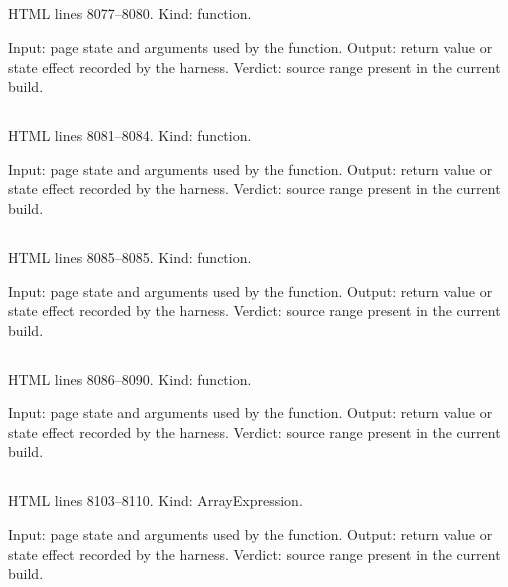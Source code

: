 \subsection*{\texttt{}}
\label{vf_427_csvq}
HTML lines 8077--8080. Kind: function.

Input: page state and arguments used by the function.
Output: return value or state effect recorded by the harness.
Verdict: source range present in the current build.

\subsection*{\texttt{}}
\label{vf_428_toCSV}
HTML lines 8081--8084. Kind: function.

Input: page state and arguments used by the function.
Output: return value or state effect recorded by the harness.
Verdict: source range present in the current build.

\subsection*{\texttt{}}
\label{vf_429_stamp}
HTML lines 8085--8085. Kind: function.

Input: page state and arguments used by the function.
Output: return value or state effect recorded by the harness.
Verdict: source range present in the current build.

\subsection*{\texttt{}}
\label{vf_430_baseName}
HTML lines 8086--8090. Kind: function.

Input: page state and arguments used by the function.
Output: return value or state effect recorded by the harness.
Verdict: source range present in the current build.

\subsection*{\texttt{}}
\label{vf_431_NAME_ROLE_RULES}
HTML lines 8103--8110. Kind: ArrayExpression.

Input: page state and arguments used by the function.
Output: return value or state effect recorded by the harness.
Verdict: source range present in the current build.

